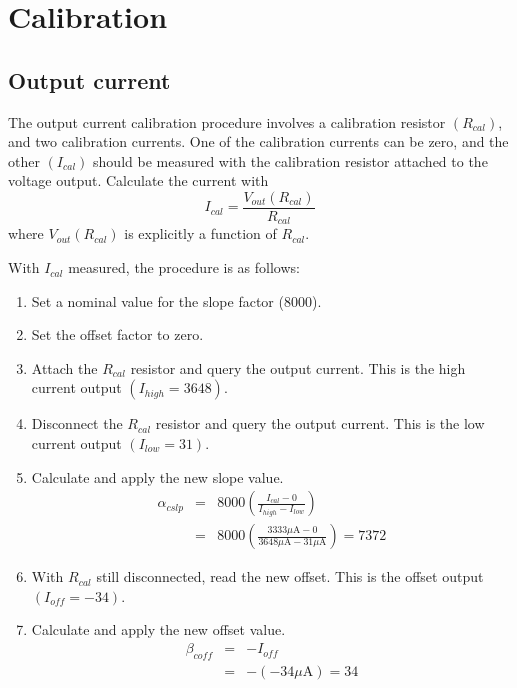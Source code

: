 \section{Calibration}

\subsection{Output current}
The output current calibration procedure involves a calibration
resistor $\left( R_{cal} \right)$, and two calibration currents.  One
of the calibration currents can be zero, and the other $\left( I_{cal}
\right)$ should be measured with the calibration resistor attached to
the voltage output.  Calculate the current with
\begin{equation}
\label{eqn:ical}
I_{cal} = \frac{V_{out} \left( R_{cal} \right) }{R_{cal}}
\end{equation}
where $V_{out} \left( R_{cal} \right)$ is explicitly a function of
$R_{cal}$.

With $I_{cal}$ measured, the procedure is as follows:
\begin{enumerate}
\item Set a nominal value for the slope factor (8000).
\item Set the offset factor to zero.
\item Attach the $R_{cal}$ resistor and query the output current.
  This is the high current output $\left( I_{high} = 3648 \right)$.
\item Disconnect the $R_{cal}$ resistor and query the output current.
  This is the low current output $\left( I_{low} = 31 \right)$.

\item Calculate and apply the new slope value.
  \begin{eqnarray*}
    \alpha_{cslp} &=& 8000 \left( \frac{ I_{cal} - 0}
      {I_{high} - I_{low}} \right)\\
    &=& 8000 \left( \frac{ 3333 \mu\mbox{A} - 0}
      {3648 \mu\mbox{A} - 31 \mu\mbox{A}} \right) = 7372
  \end{eqnarray*}

\item With $R_{cal}$ still disconnected, read the new offset.
This is the offset output $\left( I_{off} = -34 \right)$.

\item Calculate and apply the new offset value.
  \begin{eqnarray*}
    \beta_{coff} &=& -I_{off}\\
    &=& -(-34\mu\mbox{A}) = 34
  \end{eqnarray*}

\end{enumerate}
